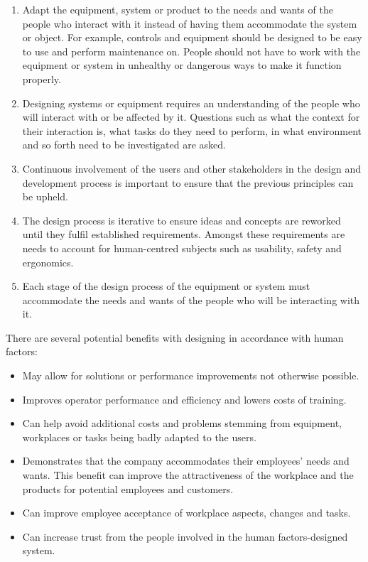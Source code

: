 \documentclass[
  12pt,
]{scrbook}
\begin{document}
\begin{enumerate}
\def\labelenumi{\arabic{enumi}.}
\item
  Adapt the equipment, system or product to the needs and wants of the people who interact with it instead of having them accommodate the system or object. For example, controls and equipment should be designed to be easy to use and perform maintenance on. People should not have to work with the equipment or system in unhealthy or dangerous ways to make it function properly.
\item
  Designing systems or equipment requires an understanding of the people who will interact with or be affected by it. Questions such as what the context for their interaction is, what tasks do they need to perform, in what environment and so forth need to be investigated are asked.
\item
  Continuous involvement of the users and other stakeholders in the design and development process is important to ensure that the previous principles can be upheld.
\item
  The design process is iterative to ensure ideas and concepts are reworked until they fulfil established requirements. Amongst these requirements are needs to account for human-centred subjects such as usability, safety and ergonomics.
\item
  Each stage of the design process of the equipment or system must accommodate the needs and wants of the people who will be interacting with it.
\end{enumerate}

There are several potential benefits with designing in accordance with human factors:

\begin{itemize}
\item
  May allow for solutions or performance improvements not otherwise possible.
\item
  Improves operator performance and efficiency and lowers costs of training.
\item
  Can help avoid additional costs and problems stemming from equipment, workplaces or tasks being badly adapted to the users.
\item
  Demonstrates that the company accommodates their employees' needs and wants. This benefit can improve the attractiveness of the workplace and the products for potential employees and customers.
\item
  Can improve employee acceptance of workplace aspects, changes and tasks.
\item
  Can increase trust from the people involved in the human factors-designed system.
\end{itemize}
\end{document}
